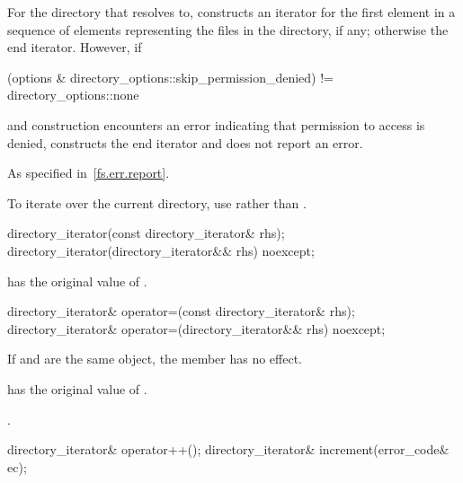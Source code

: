 \begin{itemdescr}
\pnum
\effects
For the directory that  resolves to, constructs an
iterator for the first element in a sequence of 
elements representing the files in the directory, if any; otherwise the end
iterator. However, if
\begin{codeblock}
(options & directory_options::skip_permission_denied) != directory_options::none
\end{codeblock}
and construction encounters an error indicating
that permission to access  is denied, constructs the end iterator
and does not report an error.

\pnum
\throws
As specified in~\ref{fs.err.report}.

\pnum
\begin{note}
To iterate over the current directory, use  rather than .
\end{note}
\end{itemdescr}

%
\begin{itemdecl}
directory_iterator(const directory_iterator& rhs);
directory_iterator(directory_iterator&& rhs) noexcept;
\end{itemdecl}

\begin{itemdescr}
\pnum
\ensures
{} has the original value of .
\end{itemdescr}

%
\begin{itemdecl}
directory_iterator& operator=(const directory_iterator& rhs);
directory_iterator& operator=(directory_iterator&& rhs) noexcept;
\end{itemdecl}

\begin{itemdescr}
\pnum
\effects
If  and  are the same
  object, the member has no effect.

\pnum
\ensures
{} has the original value of .

\pnum
\returns
{}.
\end{itemdescr}

%
%
\begin{itemdecl}
directory_iterator& operator++();
directory_iterator& increment(error_code& ec);
\end{itemdecl}

